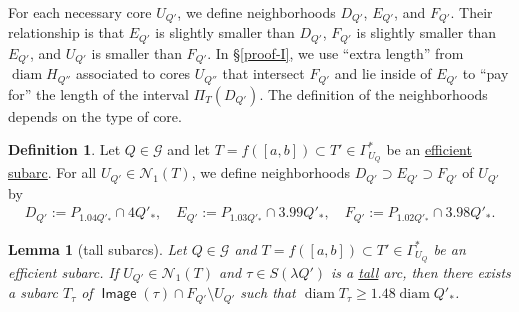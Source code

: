 \documentclass[12pt]{amsart}
\numberwithin{equation}{section}
\theoremstyle{plain}
\newtheorem{lemma}[theorem]{Lemma}
\theoremstyle{definition}
\newtheorem{definition}[theorem]{Definition}
\newcommand{\diam}{\mathop\mathrm{diam}\nolimits}
\newcommand{\Image}{\mathop\mathsf{Image}\nolimits}
\numberwithin{figure}{section}
\begin{document}
For each necessary core $U_{Q'}$, we define neighborhoods $D_{Q'}$, $E_{Q'}$, and $F_{Q'}$. Their relationship is that $E_{Q'}$ is slightly smaller than $D_{Q'}$, $F_{Q'}$ is slightly smaller than $E_{Q'}$, and $U_{Q'}$ is smaller than $F_{Q'}$. In \S\ref{proof-I}, we use ``extra length'' from $\diam H_{Q''}$ associated to cores $U_{Q''}$ that intersect $F_{Q'}$ and lie inside of $E_{Q'}$ to ``pay for'' the length of the interval $\Pi_T(D_{Q'})$. The definition of the neighborhoods depends on the type of core.

\begin{definition}\label{d:E, E-star N1 def}
Let $Q\in\mathscr{G}$ and let $T=f([a,b])\subset T'\in\Gamma^*_{U_Q}$ be an \hyperref[def:subarc]{efficient subarc}. For all $U_{Q'}\in\mathcal{N}_1(T)$, we define neighborhoods $D_{Q'}\supset E_{Q'}\supset F_{Q'}$ of $U_{Q'}$ by
\begin{align*}
    D_{Q'} := P_{1.04Q'_*}\cap 4Q'_*, \quad E_{Q'} := P_{1.03Q'_*}\cap 3.99Q'_*, \quad F_{Q'} := P_{1.02Q'_*}\cap 3.98Q'_*.
\end{align*}
\end{definition}

\begin{lemma}[tall subarcs] \label{tall arc criterion} Let $Q\in\mathscr{G}$ and $T=f([a,b])\subset T'\in\Gamma^*_{U_Q}$ be an efficient subarc. If $U_{Q'}\in\mathcal{N}_1(T)$ and $\tau\in S(\lambda Q')$ is a \hyperref[tall]{tall} arc, then there exists a subarc $T_{\tau}$ of $\Image(\tau)\cap F_{Q'} \setminus U_{Q'}$ such that $\diam T_{\tau} \geq 1.48\diam Q'_*$.
\end{lemma}
\end{document}
